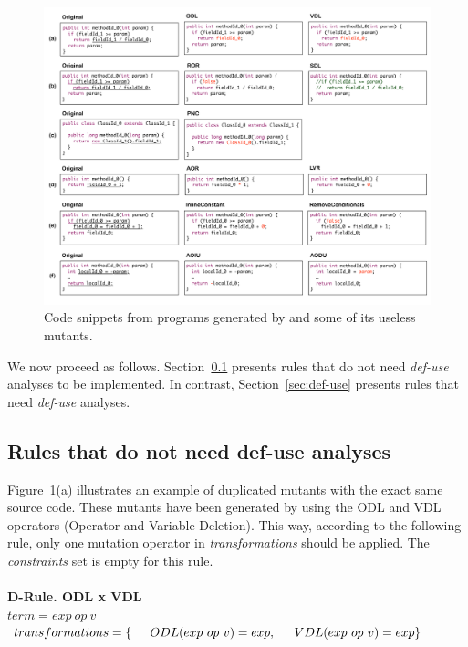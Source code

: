 \begin{figure}[ht]
	\begin{center}
		\includegraphics[scale=0.37]{images/Useless-Examples.pdf}
		\caption{Code snippets from programs generated by \jdolly{} and some of its useless mutants.}
		\label{fig:useless-examples}
	\end{center}
\end{figure}

We now proceed as follows. Section~\ref{sec:no-def-use} presents rules that do not need \textit{def-use} analyses to be implemented. In contrast, Section~\ref{sec:def-use} presents rules that need \textit{def-use} analyses.

\subsection{Rules that do not need def-use analyses}
\label{sec:no-def-use}

Figure~\ref{fig:useless-examples}(a) illustrates an example of duplicated mutants with the exact same source code. These mutants have been generated by using the ODL and VDL operators (Operator and Variable Deletion). This way, according to the following rule, only one mutation operator in \textit{transformations} should be applied. The \textit{constraints} set is empty for this rule.
\\
\\
\textbf{D-Rule. ODL x VDL}\\
$term = exp~op~v $\\
$transformations = \{\\ \indent ODL(exp~op~v) = exp,\\ \indent VDL(exp~op~v) = exp\\\}$\\

